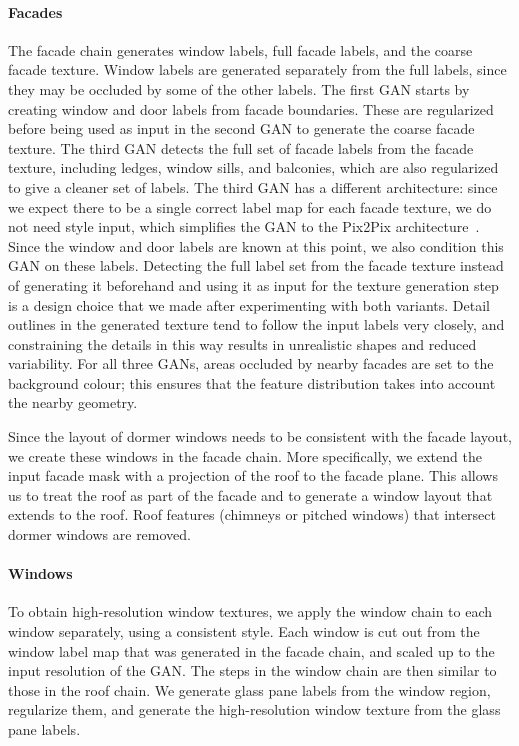 \paragraph{Facades}
The facade chain generates window labels, full facade labels, and the coarse facade texture. Window labels are generated separately from the full labels, since they may be occluded by some of the other labels. The first GAN starts by creating window and door labels from facade boundaries. These are regularized before being used as input in the second GAN to generate the coarse facade texture. The third GAN detects the full set of facade labels from the facade texture, including ledges, window sills, and balconies, which are also regularized to give a cleaner set of labels. The third GAN has a different architecture: since we expect there to be a single correct label map for each facade texture, we do not need style input, which simplifies the GAN to the Pix2Pix architecture~\cite{pix2pix}. Since the window and door labels are known at this point, we also condition this GAN on these labels. Detecting the full label set from the facade texture instead of generating it beforehand and using it as input for the texture generation step is a design choice that we made after experimenting with both variants. Detail outlines in the generated texture tend to follow the input labels very closely, and constraining the details in this way results in unrealistic shapes and reduced variability. For all three GANs, areas occluded by nearby facades are set to the background colour; this ensures that the feature distribution takes into account the nearby geometry.

Since the layout of dormer windows needs to be consistent with the facade layout, we create these windows in the facade chain. More specifically, we extend the input facade mask with a projection of the roof to the facade plane. This allows us to treat the roof as part of the facade and to generate a window layout that extends to the roof. Roof features (chimneys or pitched windows) that intersect dormer windows are removed. 

\paragraph{Windows}
To obtain high-resolution window textures, we apply the window chain to each window separately, using a consistent style. Each window is cut out from the window label map that was generated in the facade chain, and scaled up to the input resolution of the GAN. The steps in the window chain are then similar to those in the roof chain. We generate glass pane labels from the window region, regularize them, and generate the high-resolution window texture from the glass pane labels. %

